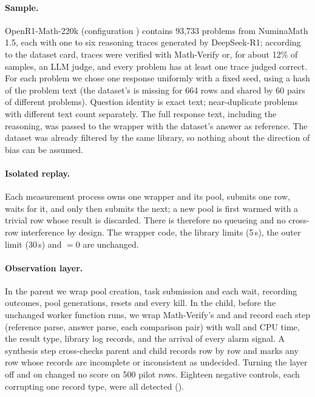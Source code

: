 \documentclass[11pt,a4paper]{article}
\begin{document}
\paragraph{Sample.} OpenR1-Math-220k \cite{openr1} (configuration ) contains 93,733 problems from NuminaMath 1.5, each with one to six reasoning traces generated by DeepSeek-R1; according to the dataset card, traces were verified with Math-Verify or, for about 12\% of samples, an LLM judge, and every problem has at least one trace judged correct. For each problem we chose one response uniformly with a fixed seed, using a hash of the problem text (the dataset's  is missing for 664 rows and shared by 60 pairs of different problems). Question identity is exact text; near-duplicate problems with different text count separately. The full response text, including the reasoning, was passed to the wrapper with the dataset's answer as reference. The dataset was already filtered by the same library, so nothing about the direction of bias can be assumed.

\paragraph{Isolated replay.} Each measurement process owns one wrapper and its pool, submits one row, waits for it, and only then submits the next; a new pool is first warmed with a trivial row whose result is discarded. There is therefore no queueing and no cross-row interference by design. The wrapper code, the library limits (5\,s), the outer limit (30\,s) and $=0$ are unchanged.

\paragraph{Observation layer.} In the parent we wrap pool creation, task submission and each wait, recording outcomes, pool generations, resets and every kill. In the child, before the unchanged worker function runs, we wrap Math-Verify's  and  and record each step (reference parse, answer parse, each comparison pair) with wall and CPU time, the result type, library log records, and the arrival of every alarm signal. A synthesis step cross-checks parent and child records row by row and marks any row whose records are incomplete or inconsistent as undecided. Turning the layer off and on changed no score on 500 pilot rows. Eighteen negative controls, each corrupting one record type, were all detected ().
\end{document}
